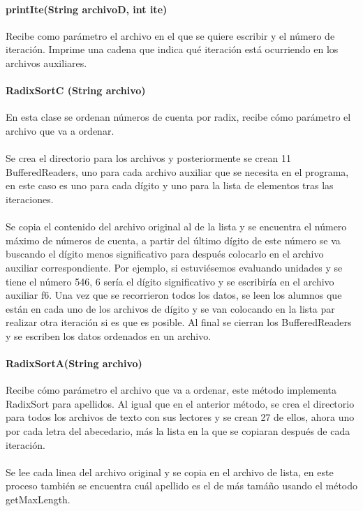 \documentclass[11pt]{article}
\begin{document}
\paragraph{printIte(String archivoD, int ite) }
Recibe como parámetro el archivo en el que se quiere escribir y el número de iteración. Imprime una cadena que indica qué iteración está ocurriendo en los archivos auxiliares. 


\paragraph{RadixSortC (String archivo)}
En esta clase se ordenan números de cuenta por radix, recibe cómo parámetro el archivo que va a ordenar.  
\paragraph{}
Se crea el directorio para los archivos y posteriormente se crean 11 BufferedReaders, uno para cada archivo auxiliar que se necesita en el programa, en este caso es uno para cada dígito y uno para la lista de elementos tras las iteraciones. 
\paragraph{} 
Se copia el contenido del archivo original al de la lista y se encuentra el número máximo de números de cuenta, a partir del último dígito de este número se va buscando el dígito menos significativo para después colocarlo en el archivo auxiliar correspondiente. Por ejemplo, si estuviésemos evaluando unidades y se tiene el número 546, 6 sería el dígito significativo y se escribiría en el archivo auxiliar f6.
Una vez que se recorrieron todos los datos, se leen los alumnos que están en cada uno de los archivos de dígito y se van colocando en la lista par realizar otra iteración si es que es posible. 
Al final se cierran los BufferedReaders y se escriben los datos ordenados en un archivo.  

\paragraph{RadixSortA(String archivo)}
Recibe cómo parámetro el archivo que va a ordenar, este método implementa RadixSort para apellidos.
Al igual que en el anterior método, se crea el directorio para todos los archivos de texto con sus lectores y se crean 27 de ellos, ahora uno por cada letra del abecedario, más la lista en la que se copiaran después de cada iteración.  
\paragraph{}
Se lee cada linea del archivo original y se copia en el archivo de lista, en este proceso también se encuentra cuál apellido es el de más tamáño usando el método getMaxLength.
\end{document}
